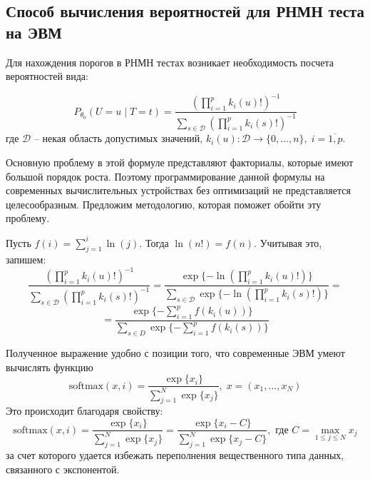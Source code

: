 \subsection{Способ вычисления вероятностей для РНМН теста
на ЭВМ}

Для нахождения порогов в РНМН тестах возникает необходимость
посчета вероятностей вида:

$$P_{\theta_0}(U=u \mid T=t)=\dfrac{(\prod_{i=1}^p k_i(u)!)^{-1}}
            {\sum_{s\in \mathcal{D}} (\prod_{i=1}^p k_i(s)!)^{-1}}$$
где $\mathcal{D}$ -- некая область допустимых значений,
$k_i(u):\mathcal{D} \to \{0,\ldots,n\}, \; i=\overline{1,p}$.

Основную проблему в этой формуле представляют 
факториалы, которые имеют большой порядок роста. 
Поэтому программирование данной формулы 
на современных вычислительных устройствах без оптимизаций не представляется
целесообразным.
Предложим методологию, которая поможет обойти эту проблему.

    Пусть $f(i)=\sum_{j=1}^{i} \ln(j)$. Тогда $\ln(n!)=f(n)$.
    Учитывая это, запишем:
    $$
    \dfrac{(\prod_{i=1}^p k_i(u)!)^{-1}}
            {\sum_{s\in \mathcal{D}} (\prod_{i=1}^p k_i(s)!)^{-1}}=
    \dfrac{\exp\{-\ln(\prod_{i=1}^p k_i(u)!)\}}
    {\sum_{s\in \mathcal{D}} \exp \{-\ln(\prod_{i=1}^p k_i(s)!)\}}=
    $$
    $$
    = \dfrac{\exp \{ -\sum_{i=1}^p f(k_i(u)) \}}
    {\sum_{s \in D} \exp \{ -\sum_{i=1}^p f(k_i(s)) \}}
    $$
    
    Полученное выражение удобно с позиции того, что современные ЭВМ умеют вычислять функцию
    $$
    \text{softmax}(x,i)=\dfrac{\exp\{x_i\}}{\sum_{j=1}^{N} \exp\{x_j\}}, \; x=(x_1,\ldots,x_N)
    $$
    Это происходит благодаря свойству:
    $$
    \text{softmax}(x,i)=\dfrac{\exp\{x_i\}}{\sum_{j=1}^{N} \exp\{x_j\}} = \dfrac{\exp\{x_i - C\}}{\sum_{j=1}^{N} \exp\{x_j - C\}}
    , \text{ где } C=\max_{1\leq j \leq N} x_j
    $$
    за счет которого удается избежать переполнения вещественного типа данных, связанного с экспонентой.
